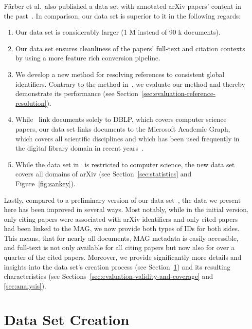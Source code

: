 F{\"{a}}rber et al.\ also published a data set with annotated arXiv papers' content in the past~\cite{Faerber2018LREC}. In comparison, our data set is superior to it in the following regards:
\begin{enumerate}
    \item[(1)] Our data set is considerably larger (1 M instead of 90 k documents).
    \item[(2)] Our data set ensures cleanliness of the papers' full-text and citation contexts by using a more feature rich conversion pipeline.
    \item[(3)] We develop a new method for resolving references to consistent global identifiers. Contrary to the method in~\cite{Faerber2018LREC}, we evaluate our method and thereby demonstrate its performance (see Section~\ref{sec:evaluation-reference-resolution}).
    \item[(4)] While~\cite{Faerber2018LREC} link documents solely to DBLP, which covers computer science papers, our data set links documents to the Microsoft Academic Graph, which covers all scientific disciplines and which has been used frequently in the digital library domain in recent years~\cite{Mohapatra2019}.
    \item[(5)] While the data set in~\cite{Faerber2018LREC} is restricted to computer science, the new data set covers all domains of arXiv (see Section~\ref{sec:statistics} and Figure~\ref{fig:sankey}).
\end{enumerate}

Lastly, compared to a preliminary version of our data set~\cite{Saier2019}, the data we present here has been improved in several ways. Most notably, while in the initial version, only citing papers were associated with arXiv identifiers and only cited papers had been linked to the MAG, we now provide both types of IDs for both sides. This means, that for nearly all documents, MAG metadata is easily accessible, and full-text is not only available for all citing papers but now also for over a quarter of the cited papers. Moreover, we provide significantly more details and insights into the data set's creation process (see Section~\ref{sec:data-set-creation}) and its resulting characteristics (see Sections~\ref{sec:evaluation-validity-and-coverage} and \ref{sec:analysis}).



\section{Data Set Creation}
\label{sec:data-set-creation}


